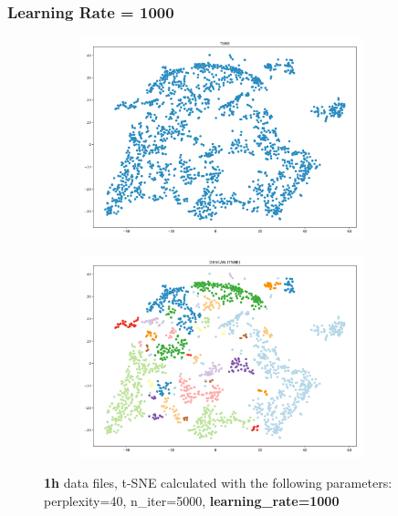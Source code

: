 \subsubsection{Learning Rate = 1000}
\begin{figure}[H]
  \centering
  \begin{subfigure}{.5\textwidth}
    \centering
    \includegraphics[width=0.9\textwidth]{./images/tsneParametersTest/learningRate/lr1000-1hTSNE.png}
  \end{subfigure}%
  \begin{subfigure}{.5\textwidth}
    \centering
    \includegraphics[width=0.9\textwidth]{./images/tsneParametersTest/learningRate/lr1000-1hDBSCAN.png}
  \end{subfigure}
	\caption{\textbf{1h} data files, t-SNE calculated with the following parameters: perplexity=40, n\_iter=5000, \textbf{learning\_rate=1000}}
	\label{figure:1hlr1000TSNE}
\end{figure}

